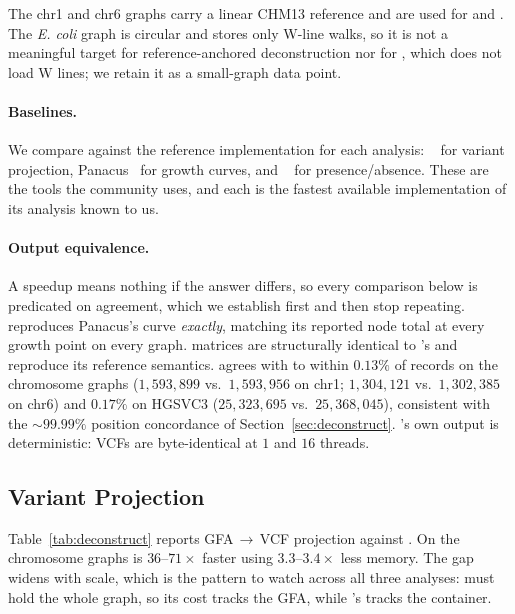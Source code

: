 The chr1 and chr6 graphs carry a linear CHM13 reference and are used for
 and . The \emph{E. coli} graph is circular and stores
only W-line walks, so it is not a meaningful target for reference-anchored
deconstruction nor for , which does not load W lines; we retain it
as a small-graph  data point.

\paragraph{Baselines.}
We compare against the reference implementation for each analysis:
~\cite{garrison2018variation} for variant projection,
Panacus~\cite{parmigiani2024panacus} for growth curves, and
~\cite{guarracino2022odgi} for presence/absence. These are the tools
the community uses, and each is the fastest available implementation of its
analysis known to us.

\paragraph{Output equivalence.}
A speedup means nothing if the answer differs, so every comparison below is
predicated on agreement, which we establish first and then stop repeating.
 reproduces Panacus's curve \emph{exactly}, matching its reported node
total at every growth point on every graph.  matrices are structurally
identical to 's and reproduce its reference semantics.
 agrees with  to within $0.13\%$ of records on the
chromosome graphs ($1{,}593{,}899$ vs.\ $1{,}593{,}956$ on chr1; $1{,}304{,}121$
vs.\ $1{,}302{,}385$ on chr6) and $0.17\%$ on HGSVC3 ($25{,}323{,}695$ vs.\
$25{,}368{,}045$), consistent with the $\sim$$99.99\%$ position concordance of
Section~\ref{sec:deconstruct}. \sys's own output is deterministic: VCFs are
byte-identical at $1$ and $16$ threads.

\subsection{Variant Projection}
\label{subsec:eval-deconstruct}

Table~\ref{tab:deconstruct} reports GFA\,$\rightarrow$\,VCF projection against
\cmd{vg deconstruct}. On the chromosome graphs \sys is $36$--$71\times$ faster
using $3.3$--$3.4\times$ less memory. The gap widens with scale, which is the
pattern to watch across all three analyses: \cmd{vg} must hold the whole graph, so
its cost tracks the GFA, while \sys's tracks the container.

